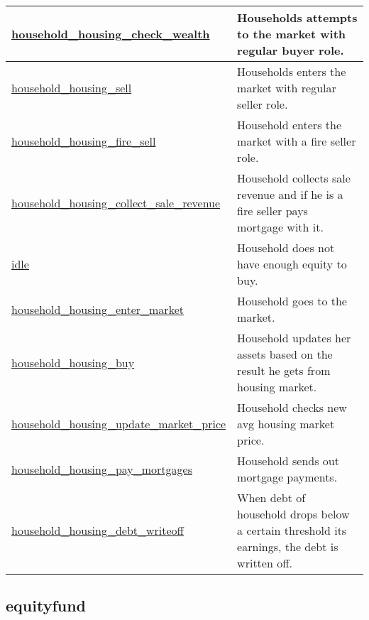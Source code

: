 \documentclass[a4paper,11pt]{article}
\begin{document}
\begin{longtable}[H!]{ll}
\midrule
\parbox{5cm}{\url{household_housing_check_wealth}}  & \parbox{10cm}{Households attempts to the market with regular buyer role.} \\
\midrule
\parbox{5cm}{\url{household_housing_sell}}  & \parbox{10cm}{Households enters the market with regular seller role.} \\
\midrule
\parbox{5cm}{\url{household_housing_fire_sell}}  & \parbox{10cm}{Household enters the market with a fire seller role.} \\
\midrule
\parbox{5cm}{\url{household_housing_collect_sale_revenue}}  & \parbox{10cm}{Household collects sale revenue and if he is a fire seller pays mortgage with it.} \\
\midrule
\parbox{5cm}{\url{idle}}  & \parbox{10cm}{Household does not have enough equity to buy.} \\
\midrule
\parbox{5cm}{\url{household_housing_enter_market}}  & \parbox{10cm}{Household goes to the market.} \\
\midrule
\parbox{5cm}{\url{household_housing_buy}}  & \parbox{10cm}{Household updates her assets based on the result he gets from housing market.} \\
\midrule
\parbox{5cm}{\url{household_housing_update_market_price}}  & \parbox{10cm}{Household checks new avg housing market price.} \\
\midrule
\parbox{5cm}{\url{household_housing_pay_mortgages}}  & \parbox{10cm}{Household sends out mortgage payments.} \\
\midrule
\parbox{5cm}{\url{household_housing_debt_writeoff}}  & \parbox{10cm}{When debt of household drops below a certain threshold its earnings, the debt is written off.} \\
\end{longtable}

\subsection{equityfund}
\end{document}
